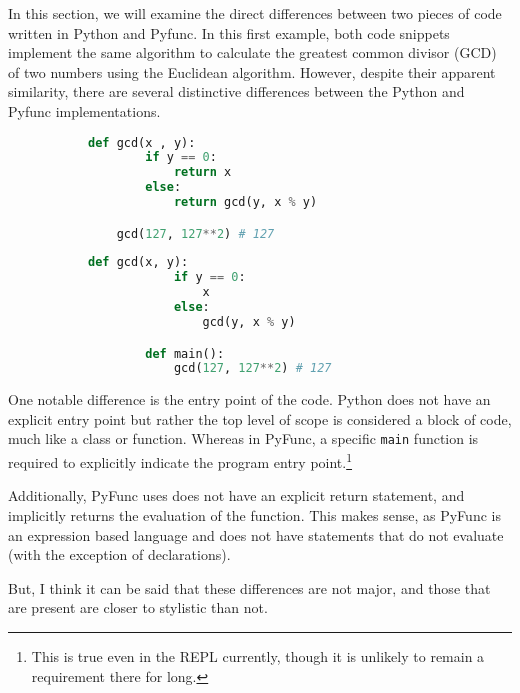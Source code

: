 \documentclass{l4proj}
\begin{document}
In this section, we will examine the direct differences between two pieces of code written in Python and Pyfunc.
In this first example, both code snippets implement the same algorithm to calculate the greatest common divisor (GCD) of two numbers using the Euclidean algorithm.
However, despite their apparent similarity, there are several distinctive differences between the Python and Pyfunc implementations.

\begin{figure}[H]
\begin{subfigure}{0.45\textwidth}
    \begin{lstlisting}[language=Python, label=lst:python-gcd, caption=Python greatest common divisor program.]
    def gcd(x , y):
        if y == 0:
            return x
        else:
            return gcd(y, x % y)

    gcd(127, 127**2) # 127
    \end{lstlisting}
\end{subfigure}
\hfill
\begin{subfigure}{0.45\textwidth}
    \begin{lstlisting}[language=Python, label=lst:pyfunc-gcd, caption=Pyfunc greatest common divisor example program.]
        def gcd(x, y):
            if y == 0:
                x
            else:
                gcd(y, x % y)

        def main():
            gcd(127, 127**2) # 127
    \end{lstlisting}
\end{subfigure}
\end{figure}

One notable difference is the entry point of the code.
Python does not have an explicit entry point but rather the top level of scope is considered a block of code, much like a class or function\cite{Python_documentation}.
Whereas in PyFunc, a specific \texttt{main} function is required to explicitly indicate the program entry point.\footnote{This is true even in the REPL currently, though it is unlikely to remain a requirement there for long.}

Additionally, PyFunc uses does not have an explicit return statement, and implicitly returns the evaluation of the function.
This makes sense, as PyFunc is an expression based language and does not have statements that do not evaluate (with the exception of declarations).

But, I think it can be said that these differences are not major, and those that are present are closer to stylistic than not.
\end{document}
